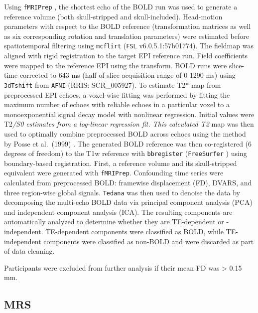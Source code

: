 \documentclass[
true
]{sn-jnl}
\begin{document}
Using \texttt{fMRIPrep} \citep{estebanFMRIPrepRobustPreprocessing2019},
the shortest echo of the BOLD run was used to generate a reference
volume (both skull-stripped and skull-included). Head-motion parameters
with respect to the BOLD reference (transformation matrices as well as
six corresponding rotation and translation parameters) were estimated
before spatiotemporal filtering using \texttt{mcflirt}
\citep{jenkinsonImprovedOptimizationRobust2002} (\texttt{FSL}
v6.0.5.1:57b01774). The fieldmap was aligned with rigid registration to
the target EPI reference run. Field coefficients were mapped to the
reference EPI using the transform. BOLD runs were slice-time corrected
to 643 ms (half of slice acquisition range of 0-1290 ms) using
\texttt{3dTshift} from \texttt{AFNI} \citep{coxAFNISoftwareAnalysis1996}
(RRIS: SCR\_005927). To estimate T2* map from preprocessed EPI echoes, a
voxel-wise fitting was performed by fitting the maximum number of echoes
with reliable echoes in a particular voxel to a monoexponential signal
decay model with nonlinear regression. Initial values were T2\emph{/S0
estimates from a log-linear regression fit. This calculated T2} map was
then used to optimally combine preprocessed BOLD across echoes using the
method by Posse et al.~(1999)
\citep{posseEnhancementBOLDcontrastSensitivity1999}. The generated BOLD
reference was then co-registered (6 degrees of freedom) to the T1w
reference with \texttt{bbregister} (\texttt{FreeSurfer}
\citep{daleCorticalSurfacebasedAnalysis1999}) using boundary-based
registration. First, a reference volume and its skull-stripped
equivalent were generated with \texttt{fMRIPrep}. Confounding time
series were calculated from preprocessed BOLD: framewise displacement
(FD), DVARS, and three region-wise global signals. \texttt{Tedana}
\citep{dupreTEdependentAnalysisMultiecho2021} was then used to denoise
the data by decomposing the multi-echo BOLD data via principal component
analysis (PCA) and independent component analysis (ICA). The resulting
components are automatically analyzed to determine whether they are
TE-dependent or -independent. TE-dependent components were classified as
BOLD, while TE-independent components were classified as non-BOLD and
were discarded as part of data cleaning.

Participants were excluded from further analysis if their mean FD was
\textgreater{} 0.15 mm.

\subsection{MRS}\label{mrs}
\end{document}
